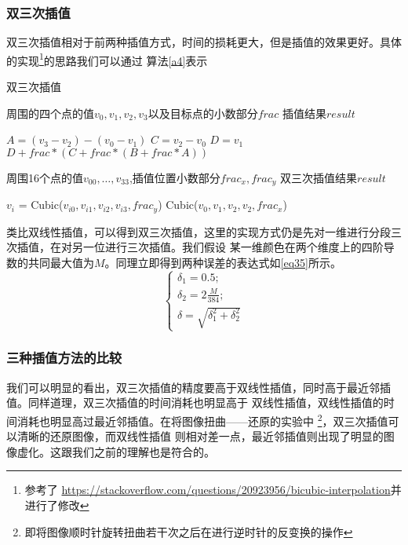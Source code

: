 \documentclass[UTF8,a4paper]{paper}
\begin{document}
\subsubsection{双三次插值}
双三次插值相对于前两种插值方式，时间的损耗更大，但是插值的效果更好。具体的实现\footnote{参考了
\url{https://stackoverflow.com/questions/20923956/bicubic-interpolation}并进行了修改}的思路我们可以通过
算法\ref{a4}表示
\begin{algorithm}[h]\caption{双三次插值}\label{a4}\begin{algorithmic}
    \Require 周围的四个点的值$v_0,v_1,v_2,v_3$以及目标点的小数部分$frac$
    \Ensure 插值结果$result$\end{algorithmic}\begin{algorithmic}[1]
    \State $A = (v_3-v_2)-(v_0-v_1)$
    \State $C = v_2 - v_0$
    \State $D = v_1$
    \State \Return $D + frac * (C + frac * (B + frac * A))$
    \EndFunction\end{algorithmic}\begin{algorithmic}
    \State \State \State
    \Require 周围16个点的值$v_{00},\hdots,v_{33}$,插值位置小数部分$frac_x,frac_y$
    \Ensure 双三次插值结果$result$\end{algorithmic}\begin{algorithmic}[1]
        \State $v_i$ = Cubic($v_{i0},v_{i1},v_{i2},v_{i3},frac_y$)
    \EndFor
    \State \Return Cubic($v_0,v_1,v_2,v_2,frac_x$)
    \EndFunction
    \end{algorithmic}
\end{algorithm}
类比双线性插值，可以得到双三次插值，这里的实现方式仍是先对一维进行分段三次插值，在对另一位进行三次插值。我们假设
某一维颜色在两个维度上的四阶导数的共同最大值为$M$。同理立即得到两种误差的表达式如\ref{eq35}所示。
\begin{equation}\begin{cases}
\delta_1 = 0.5;\\
\delta_2 = 2\frac{M}{384};\\
\delta = \sqrt{\delta_1^2 + \delta_2^2}
\end{cases}\end{equation}
\subsubsection{三种插值方法的比较}
我们可以明显的看出，双三次插值的精度要高于双线性插值，同时高于最近邻插值。同样道理，双三次插值的时间消耗也明显高于
双线性插值，双线性插值的时间消耗也明显高过最近邻插值。在将图像扭曲——还原的实验中
\footnote{即将图像顺时针旋转扭曲若干次之后在进行逆时针的反变换的操作}，双三次插值可以清晰的还原图像，而双线性插值
则相对差一点，最近邻插值则出现了明显的图像虚化。这跟我们之前的理解也是符合的。
\end{document}
